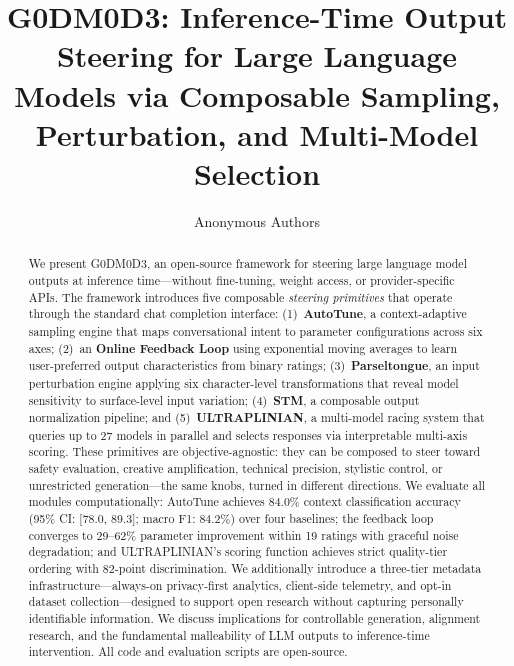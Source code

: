 \documentclass[11pt]{article}
\title{G0DM0D3: Inference-Time Output Steering for Large Language Models via Composable Sampling, Perturbation, and Multi-Model Selection}
\author{
  Anonymous Authors
}
\begin{document}
\maketitle

\begin{abstract}
We present \textsc{G0DM0D3}, an open-source framework for steering large language model outputs at inference time---without fine-tuning, weight access, or provider-specific APIs. The framework introduces five composable \emph{steering primitives} that operate through the standard chat completion interface: (1)~\textbf{AutoTune}, a context-adaptive sampling engine that maps conversational intent to parameter configurations across six axes; (2)~an \textbf{Online Feedback Loop} using exponential moving averages to learn user-preferred output characteristics from binary ratings; (3)~\textbf{Parseltongue}, an input perturbation engine applying six character-level transformations that reveal model sensitivity to surface-level input variation; (4)~\textbf{STM}, a composable output normalization pipeline; and (5)~\textbf{ULTRAPLINIAN}, a multi-model racing system that queries up to 27 models in parallel and selects responses via interpretable multi-axis scoring. These primitives are objective-agnostic: they can be composed to steer toward safety evaluation, creative amplification, technical precision, stylistic control, or unrestricted generation---the same knobs, turned in different directions. We evaluate all modules computationally: AutoTune achieves 84.0\% context classification accuracy (95\% CI: [78.0, 89.3]; macro F1: 84.2\%) over four baselines; the feedback loop converges to 29--62\% parameter improvement within 19 ratings with graceful noise degradation; and ULTRAPLINIAN's scoring function achieves strict quality-tier ordering with 82-point discrimination. We additionally introduce a three-tier metadata infrastructure---always-on privacy-first analytics, client-side telemetry, and opt-in dataset collection---designed to support open research without capturing personally identifiable information. We discuss implications for controllable generation, alignment research, and the fundamental malleability of LLM outputs to inference-time intervention. All code and evaluation scripts are open-source.
\end{abstract}

\end{document}
